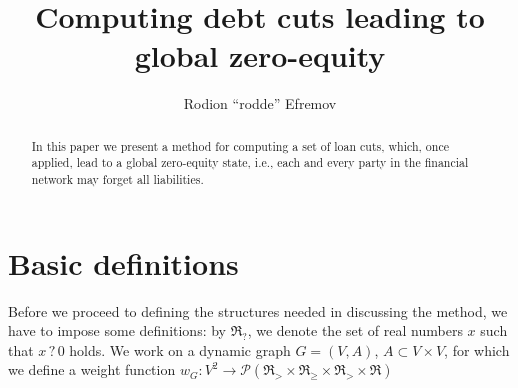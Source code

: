 \documentclass[10pt]{article}
\title{Computing debt cuts leading to global zero-equity}
\author{Rodion ``rodde'' Efremov}
\begin{document}
  \maketitle
  
  \begin{abstract}
  In this paper we present a method for computing a set of loan cuts, which, once applied, lead to a global zero-equity state, i.e., each and every party in the financial network may forget all liabilities.
  \end{abstract}
  
  \section{Basic definitions}
  Before we proceed to defining the structures needed in discussing the method, we have to impose some definitions: by $\mathfrak{R}_?$, we denote the set of real numbers $x$ such that $x \, ? \, 0$ holds. We work on a dynamic graph $G=(V,A)$, $A \subset V \times V$, for which we define a weight function $w_G \colon V^2 \to \mathcal{P}(\mathfrak{R}_> \times \mathfrak{R}_{\geq} \times \mathfrak{R}_> \times \mathfrak{R})$ 
\end{document}
